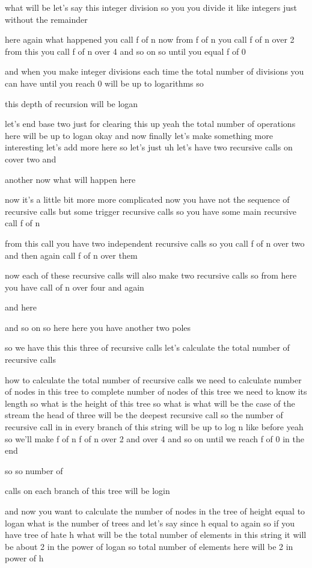 what will be let's say this integer division so you you divide it like integers just without the remainder

here again what happened you call f of n now from f of n you call f of n over 2 from this you call f of n over 4 and so on so until you equal f of 0

and when you make integer divisions each time the total number of divisions you can have until you reach 0 will be up to logarithms so

this depth of recursion will be logan

let's end base two just for clearing this up yeah the total number of operations here will be up to logan okay and now finally let's make something more interesting let's add more here so let's just uh let's have two recursive calls on cover two and

another now what will happen here

now it's a little bit more more complicated now you have not the sequence of recursive calls but some trigger recursive calls so you have some main recursive call f of n

from this call you have two independent recursive calls so you call f of n over two and then again call f of n over them

now each of these recursive calls will also make two recursive calls so from here you have call of n over four and again

and here

and so on so here here you have another two poles

so we have this this three of recursive calls let's calculate the total number of recursive calls

how to calculate the total number of recursive calls we need to calculate number of nodes in this tree to complete number of nodes of this tree we need to know its length so what is the height of this tree so what is what will be the case of the stream the head of three will be the deepest recursive call so the number of recursive call in in every branch of this string will be up to log n like before yeah so we'll make f of n f of n over 2 and over 4 and so on until we reach f of 0 in the end

so so number of

calls on each branch of this tree will be login

and now you want to calculate the number of nodes in the tree of height equal to logan what is the number of trees and let's say since h equal to again so if you have tree of hate h what will be the total number of elements in this string it will be about 2 in the power of logan so total number of elements here will be 2 in power of h

